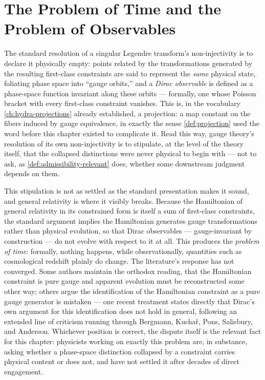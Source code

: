 \documentclass[11pt]{book}
\theoremstyle{plain}
\theoremstyle{definition}
\theoremstyle{remark}
\begin{document}
\section{The Problem of Time and the Problem of Observables}

The standard resolution of a singular Legendre transform's
non-injectivity is to declare it physically empty: points related by
the transformations generated by the resulting first-class constraints
are said to represent the \emph{same} physical state, foliating phase
space into \enquote{gauge orbits,} and a \emph{Dirac observable} is
defined as a phase-space function invariant along these orbits ---
formally, one whose Poisson bracket with every first-class constraint
vanishes. This is, in the vocabulary \cref{ch:hydra-projections}
already established, a projection: a map constant on the fibers
induced by gauge equivalence, in exactly the sense
\cref{def:projection} used the word before this chapter existed to
complicate it. Read this way, gauge theory's resolution of its own
non-injectivity is to stipulate, at the level of the theory itself,
that the collapsed distinctions were never physical to begin with ---
not to ask, as \cref{def:admissibility-relevant} does, whether some
downstream judgment depends on them.

This stipulation is not as settled as the standard presentation makes
it sound, and general relativity is where it visibly breaks. Because
the Hamiltonian of general relativity in its constrained form is
itself a sum of first-class constraints, the standard argument implies
the Hamiltonian generates gauge transformations rather than physical
evolution, so that Dirac observables --- gauge-invariant by
construction --- do not evolve with respect to it at all. This
produces the \emph{problem of time}: formally, nothing happens, while
observationally, quantities such as cosmological redshift plainly do
change. The literature's response has not converged. Some authors
maintain the orthodox reading, that the Hamiltonian constraint is pure
gauge and apparent evolution must be reconstructed some other way; others
argue the identification of the Hamiltonian constraint as a pure gauge
generator is mistaken --- one recent treatment states directly that
Dirac's own argument for this identification does not hold in general,
following an extended line of criticism running through Bergmann,
Kuchař, Pons, Salisbury, and Anderson. Whichever position is correct,
the dispute itself is the relevant fact for this chapter: physicists
working on exactly this problem are, in substance, asking whether a
phase-space distinction collapsed by a constraint carries physical
content or does not, and have not settled it after decades of direct
engagement.
\end{document}
